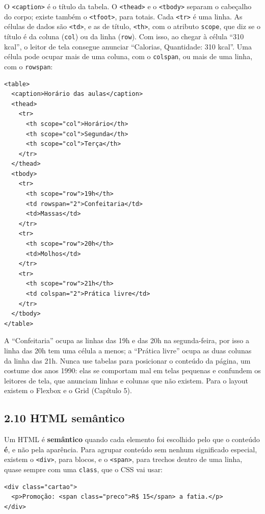 O \texttt{<caption>} é o título da tabela. O \texttt{<thead>} e o \texttt{<tbody>} separam o cabeçalho do corpo; existe também o \texttt{<tfoot>}, para totais. Cada \texttt{<tr>} é uma linha. As células de dados são \texttt{<td>}, e as de título, \texttt{<th>}, com o atributo \texttt{scope}, que diz se o título é da coluna (\texttt{col}) ou da linha (\texttt{row}). Com isso, ao chegar à célula ``310 kcal'', o leitor de tela consegue anunciar ``Calorias, Quantidade: 310 kcal''. Uma célula pode ocupar mais de uma coluna, com o \texttt{colspan}, ou mais de uma linha, com o \texttt{rowspan}:

\begin{codigo}
\begin{Verbatim}[breaklines=true, breaksymbolleft={}, fontsize=\footnotesize]
<table>
  <caption>Horário das aulas</caption>
  <thead>
    <tr>
      <th scope="col">Horário</th>
      <th scope="col">Segunda</th>
      <th scope="col">Terça</th>
    </tr>
  </thead>
  <tbody>
    <tr>
      <th scope="row">19h</th>
      <td rowspan="2">Confeitaria</td>
      <td>Massas</td>
    </tr>
    <tr>
      <th scope="row">20h</th>
      <td>Molhos</td>
    </tr>
    <tr>
      <th scope="row">21h</th>
      <td colspan="2">Prática livre</td>
    </tr>
  </tbody>
</table>
\end{Verbatim}
\end{codigo}

A ``Confeitaria'' ocupa as linhas das 19h e das 20h na segunda-feira, por isso a linha das 20h tem uma célula a menos; a ``Prática livre'' ocupa as duas colunas da linha das 21h. Nunca use tabelas para posicionar o conteúdo da página, um costume dos anos 1990: elas se comportam mal em telas pequenas e confundem os leitores de tela, que anunciam linhas e colunas que não existem. Para o layout existem o Flexbox e o Grid (Capítulo 5).

\subsection{2.10 HTML semântico}

Um HTML é \textbf{semântico} quando cada elemento foi escolhido pelo que o conteúdo \textbf{é}, e não pela aparência. Para agrupar conteúdo sem nenhum significado especial, existem o \texttt{<div>}, para blocos, e o \texttt{<span>}, para trechos dentro de uma linha, quase sempre com uma \texttt{class}, que o CSS vai usar:

\begin{codigo}
\begin{Verbatim}[breaklines=true, breaksymbolleft={}, fontsize=\footnotesize]
<div class="cartao">
  <p>Promoção: <span class="preco">R$ 15</span> a fatia.</p>
</div>
\end{Verbatim}
\end{codigo}

